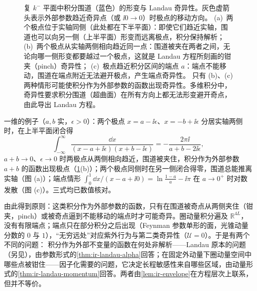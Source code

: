 \begin{figure}[htbp]
\caption{复 $k^-$ 平面中积分围道（蓝色）的形变与 Landau 奇异性。灰色虚箭头表示外部参数趋近奇异点（或 $\ii0\to0$）时极点的移动方向。
(a)~两个极点位于实轴同侧（此处都在下半平面）：即使它们趋近实轴，围道也可以向另一侧（上半平面）形变而远离极点，积分保持解析；
(b)~两个极点从实轴两侧相向趋近同一点：围道被夹在两者之间，无论向哪一侧形变都要越过一个极点，这就是 Landau 方程所刻画的钳夹（pinch）奇异性；
(c)~极点趋近积分区间的端点 $a$：端点不能移动，围道在端点附近无法避开极点，产生端点奇异性。
只有 (b)、(c) 两种情形可能使积分作为外部参数的函数出现奇异性。多维积分中，奇异性要求积分围道（超曲面）在所有方向上都无法形变避开奇点，由此导出 Landau 方程。}
\label{fig:landau-pinch}
\end{figure}

一维的例子（$a,b$ 实，$\epsilon>0$）：两个极点 $x=a-\ii\epsilon$、$x=-b+\ii\epsilon$ 分居实轴两侧时，在上半平面闭合得
\begin{equation}\label{eq:ir-toy-pinch}
\int_{-\infty}^{\infty}\frac{\dd x}{(x-a+\ii\epsilon)(x+b-\ii\epsilon)}=-\frac{2\pi\ii}{a+b-2\ii\epsilon} ,
\end{equation}
$a+b\to0$、$\epsilon\to0$ 时两极点从两侧相向趋近，围道被夹住，积分作为外部参数 $a+b$ 的函数出现极点（\cref{fig:landau-pinch}(b)）；两个极点同侧时在另一侧闭合得零，围道总能推离实轴（图 (a)）；端点情形 $\int_0^1\dd x/(x-a+\ii0)=\ln\frac{1-a}{a}-\ii\pi$ 在 $a\to0^+$ 时对数发散（图 (c)）。三式均已数值核对。

由此得到原则：这类积分作为外部参数的函数，只有在围道被奇点从两侧夹住（钳夹，pinch）或被奇点逼到不能移动的端点时才可能奇异。圈动量积分遍及 $\mathbb R^{4L}$，没有有限端点；端点只在部分积分之后出现（Feynman 参数单形的面，光锥动量分数的 $0$ 与 $1$），“无穷远处”对应紫外行为与第二类奇异性（$\mathcal U=0$）。于是有两个不同的问题：%
积分作为外部不变量的函数在何处非解析——Landau 原本的问题\cite{Landau1959}（另见\cite{Nakanishi:1959jzx}），由参数形式的\cref{thm:ir-landau-alpha}回答；在固定外动量下圈动量空间中哪些点被钳住——因子化需要的问题，它决定长程敏感性来自哪些区域\cite{Sterman1978a}，由动量形式的\cref{thm:ir-landau-momentum}回答。两者由\cref{lem:ir-envelope}在方程层次上联系，但并不等价。

